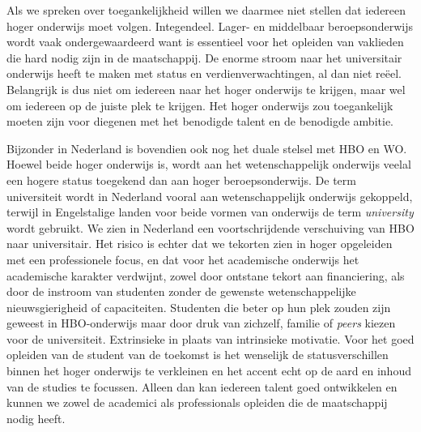 \documentclass[smallauthor, chapterhaspagenum, nochapterinheader, pagenuminheader,  bigchapnum,medium2, tocpages, garamond, titleinheader]{jote-book}
\begin{document}
	Als we spreken over toegankelijkheid willen we daarmee niet stellen dat iedereen hoger onderwijs moet volgen. Integendeel. Lager- en middelbaar beroepsonderwijs wordt vaak ondergewaardeerd want is essentieel voor het opleiden van vaklieden die hard nodig zijn in de maatschappij. De enorme stroom naar het universitair onderwijs heeft te maken met status en verdienverwachtingen, al dan niet reëel. Belangrijk is dus niet om iedereen naar het hoger onderwijs te krijgen, maar wel om iedereen op de juiste plek te krijgen. Het hoger onderwijs zou toegankelijk moeten zijn voor diegenen met het benodigde talent en de benodigde ambitie.



	Bijzonder in Nederland is bovendien ook nog het duale stelsel met HBO en WO. Hoewel beide hoger onderwijs is, wordt aan het wetenschappelijk onderwijs veelal een hogere status toegekend dan aan hoger beroepsonderwijs. De term universiteit wordt in Nederland vooral aan wetenschappelijk onderwijs gekoppeld, terwijl in Engelstalige landen voor beide vormen van onderwijs de term \emph{university} wordt gebruikt. We zien in Nederland een voortschrijdende verschuiving van HBO naar universitair. Het risico is echter dat we tekorten zien in hoger opgeleiden met een professionele focus, en dat voor het academische onderwijs het academische karakter verdwijnt, zowel door ontstane tekort aan financiering, als door de instroom van studenten zonder de gewenste wetenschappelijke nieuwsgierigheid of capaciteiten. Studenten die beter op hun plek zouden zijn geweest in HBO-onderwijs maar door druk van zichzelf, familie of \emph{peers} kiezen voor de universiteit. Extrinsieke in plaats van intrinsieke motivatie. Voor het goed opleiden van de student van de toekomst is het wenselijk de statusverschillen binnen het hoger onderwijs te verkleinen en het accent echt op de aard en inhoud van de studies te focussen. Alleen dan kan iedereen talent goed ontwikkelen en kunnen we zowel de academici als professionals opleiden die de maatschappij nodig heeft.
\end{document}
